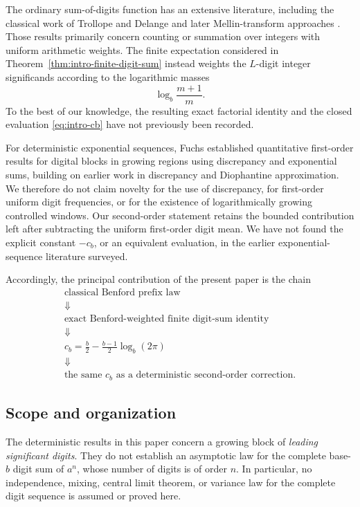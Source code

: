 \documentclass[11pt]{article}
\theoremstyle{definition}
\theoremstyle{remark}
\begin{document}
The ordinary sum-of-digits function has an extensive literature,
including the classical work of Trollope and Delange and later
Mellin-transform approaches
\cite{Trollope1968,Delange1975,FlajoletEtAl1994}.
Those results primarily concern counting or summation over integers
with uniform arithmetic weights.  The finite expectation considered
in Theorem~\ref{thm:intro-finite-digit-sum} instead weights the
\(L\)-digit integer significands according to the logarithmic masses
\[
    \log_b\frac{m+1}{m}.
\]
To the best of our knowledge, the resulting exact factorial identity
and the closed evaluation \eqref{eq:intro-cb} have not previously been
recorded.

For deterministic exponential sequences, Fuchs
\cite{Fuchs2002} established quantitative first-order results for
digital blocks in growing regions using discrepancy and exponential
sums, building on earlier work in discrepancy and Diophantine
approximation.  We therefore do not claim novelty for the use of
discrepancy, for first-order uniform digit frequencies, or for the
existence of logarithmically growing controlled windows.  Our
second-order statement retains the bounded contribution left after
subtracting the uniform first-order digit mean.  We have not found the
explicit constant \(-c_b\), or an equivalent evaluation, in the
earlier exponential-sequence literature surveyed.

Accordingly, the principal contribution of the present paper is the
chain
\[
\boxed{
\begin{gathered}
    \text{classical Benford prefix law}
    \\
    \Downarrow
    \\
    \text{exact Benford-weighted finite digit-sum identity}
    \\
    \Downarrow
    \\
    c_b=
    \frac b2-\frac{b-1}{2}\log_b(2\pi)
    \\
    \Downarrow
    \\
    \text{the same }c_b
    \text{ as a deterministic second-order correction.}
\end{gathered}
}
\]

\subsection{Scope and organization}
\label{subsec:intro-organization}

The deterministic results in this paper concern a growing block of
\emph{leading significant digits}.  They do not establish an
asymptotic law for the complete base-\(b\) digit sum of \(a^n\), whose
number of digits is of order \(n\).  In particular, no independence,
mixing, central limit theorem, or variance law for the complete digit
sequence is assumed or proved here.
\end{document}
